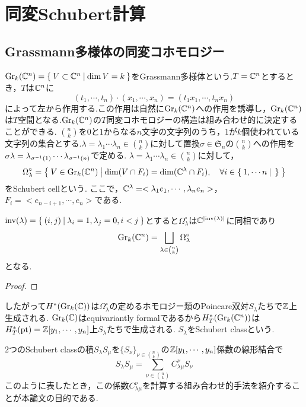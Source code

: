 \section{同変Schubert計算}
\subsection{Grassmann多様体の同変コホモロジー}
$\text{Gr}_k(\mathbb{C}^n)=\left\{\:V\subset \mathbb{C}^n\:\middle|\:\dim V = k\:\right\}$をGrassmann多様体という.$T=\mathbb{C}^n$とするとき，$T$は$\mathbb{C}^n$に
\[
(t_1,\cdots,t_n)\cdot(x_1,\cdots,x_n)=(t_1x_1,\cdots,t_nx_n)
\]
によって左から作用する.この作用は自然に$\text{Gr}_k(\mathbb{C}^n)$への作用を誘導し，$\text{Gr}_k(\mathbb{C}^n)$は$T$空間となる.$\text{Gr}_k(\mathbb{C}^n)$の$T$同変コホモロジーの構造は組み合わせ的に決定することができる.
$\binom{n}{k}$を$0$と$1$からなる$n$文字の文字列のうち，$1$が$k$個使われている文字列の集合とする.$\lambda=\lambda_1\cdots \lambda_n\in\binom{n}{k}$に対して置換$\sigma\in\mathfrak{S}_n$の$\binom{n}{k}$への作用を$\sigma\lambda=\lambda_{\sigma^{-1}(1)}\cdots\lambda_{\sigma^{-1}(n)}$で定める.
$\lambda=\lambda_1\cdots \lambda_n\in\binom{n}{k}$に対して，
\[
\Omega_\lambda^\circ=\left\{\:V\in \text{Gr}_k(\mathbb{C}^n)\:\middle|\:\dim(V\cap F_i)= \dim(\mathbb{C}^\lambda\cap F_i),\quad \forall i\in \left\{\:1,\cdots n\:\middle|\:\:\right\}\:\right\}
\]
をSchubert cellという. ここで，$\mathbb{C}^\lambda=<\lambda_1e_1,\cdots,\lambda_ne_n>$， $F_i=<e_{n-i+1},\cdots,e_n>$である. 

\begin{prop}
  $\text{inv}(\lambda)=\left\{\:(i,j)\:\middle|\:\lambda_i=1, \lambda_j=0, i<j\:\right\}$とすると$\Omega_\lambda^\circ$は$\mathbb{C}^{|\text{inv}(\lambda)|}$に同相であり
\[
\text{Gr}_k(\mathbb{C}^n)=\bigsqcup_{\lambda\in\binom{n}{k}}\Omega_\lambda^\circ
\]
となる.
\end{prop}

\begin{proof}
  
\end{proof}

したがって$H^*(\text{Gr}_k(\mathbb{C}))$は$\Omega_\lambda^\circ$の定めるホモロジー類のPoincare双対$S_\lambda$たちで$\mathbb{Z}$上生成される. $\text{Gr}_k(\mathbb{C})$はequivariantly formalであるから$H^*_T(\text{Gr}_k(\mathbb{C}^n))$は$H^*_T(\text{pt})=\mathbb{Z}[y_1,\cdots,y_n]$上$S_\lambda$たちで生成される. $S_\lambda$をSchubert classという.

$2$つのSchubert classの積$S_\lambda S_\mu$を$\{S_\nu\}_{\nu\in\binom{n}{k}}$の$\mathbb{Z}[y_1,\cdots,y_n]$係数の線形結合で
\[
S_\lambda S_\mu=\sum_{\nu\in\binom{n}{k}}C^\nu_{\lambda\mu}S_\nu
\]
このように表したとき，この係数$C^{\nu}_{\lambda\mu}$を計算する組み合わせ的手法を紹介することが本論文の目的である.


